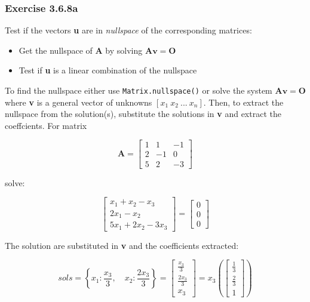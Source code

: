 \subsubsection{Exercise 3.6.8a}

Test if the vectors \textbf{u} are in \emph{nullspace} of the corresponding
matrices:

\begin{itemize}
\item Get the nullspace of \textbf{A} by solving $\mathbf{Av= O}$
\item Test if \textbf{u} is a linear combination of the nullspace
\end{itemize}

To find the nullspace either use \sympy \texttt{Matrix.nullspace()} or solve the
system $\mathbf{Av= O}$ where \textbf{v} is a general vector of unknowns $[x_1\ x_2\ ...\ x_n]$.
Then, to extract the nullspace from the solution(s), substitute the solutions in
\textbf{v} and extract the coeffcients. For matrix

$$
\mathbf{A}= \left[\begin{matrix}1 & 1 & -1\\2 & -1 & 0\\5 & 2 & -3\end{matrix}\right]
$$

solve:

$$
\left[\begin{matrix}x_{1} + x_{2} - x_{3}\\2 x_{1} - x_{2}\\5 x_{1} + 2 x_{2} - 3 x_{3}\end{matrix}\right] = \left[\begin{matrix}0\\0\\0\end{matrix}\right]
$$

The solution are substituted in \textbf{v} and the coefficients extracted:

$$
sols= \left \{ x_{1} : \frac{x_{3}}{3}, \quad x_{2} : \frac{2 x_{3}}{3}\right \} =
\left[\begin{matrix}\frac{x_{3}}{3}\\\frac{2 x_{3}}{3}\\x_{3}\end{matrix}\right] =
x_3(\left[\begin{matrix}\frac{1}{3}\\\frac{2}{3}\\1\end{matrix}\right])
$$

